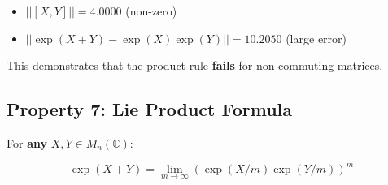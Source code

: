 \documentclass[
]{book}
\providecommand{\tightlist}{%
  \setlength{\itemsep}{0pt}\setlength{\parskip}{0pt}}
\theoremstyle{definition}
\theoremstyle{definition}
\theoremstyle{definition}
\theoremstyle{definition}
\theoremstyle{remark}
\begin{document}
\begin{itemize}
\tightlist
\item
  \(||[X,Y]|| = 4.0000\) (non-zero)
\item
  \(||\exp(X+Y) - \exp(X)\exp(Y)|| = 10.2050\) (large error)
\end{itemize}

This demonstrates that the product rule \textbf{fails} for non-commuting matrices.

\subsection{Property 7: Lie Product Formula}\label{property-7-lie-product-formula}

For \textbf{any} \(X, Y \in M_n(\mathbb{C})\):

\[\exp(X+Y) = \lim_{m \to \infty} (\exp(X/m)\exp(Y/m))^m\]
\end{document}
